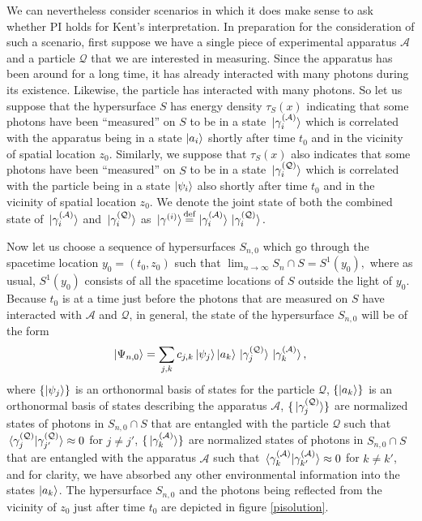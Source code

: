 We can nevertheless consider scenarios in which it does make sense to ask whether PI holds for Kent's interpretation. In preparation for the consideration of such a scenario, first suppose we have a single piece of experimental apparatus $\mathcal{A}$ and a particle $\mathcal{Q}$ that we are interested in measuring. Since the apparatus has been around for a long time, it has already interacted with many photons during its existence. Likewise, the particle has interacted with many photons. So let us suppose that the hypersurface $S$ has energy density $\tau_S(x)$ indicating that some photons have been ``measured'' on $S$ to be in a state $\ket*{\gamma_i^{(\mathcal{A})}}$ which is correlated with the apparatus being in a state $\ket{a_i}$ shortly after time $t_0$ and in the vicinity of spatial location $z_0$.  Similarly, we suppose that $\tau_S(x)$ also indicates that some photons have been ``measured'' on $S$ to be in a state $\ket*{\gamma_i^{(\mathcal{Q})}}$ which is correlated with the particle being in a state $\ket{\psi_i}$ also shortly after time $t_0$ and in the vicinity of spatial location $z_0$. We  denote the joint state of both the combined state of $\ket*{\gamma_i^{(\mathcal{A})}}$  and $\ket*{\gamma_i^{(\mathcal{Q})}}$ as
$\ket*{\gamma^{(i)}}\myeq\ket*{\gamma_i^{(\mathcal{A})}}\ket*{\gamma_i^{(\mathcal{Q})}}.$

Now let us choose a sequence of hypersurfaces $S_{n,0}$ which go through the spacetime location $y_0=(t_0, z_0)$ such that $\lim_{n\rightarrow\infty} S_n\cap S=S^1(y_0),$ where as usual,  $S^1(y_0)$ consists of all the spacetime locations of $S$ outside the light of $y_0$. Because $t_0$ is at a time just before the photons that are measured on $S$ have interacted with $\mathcal{A}$ and $\mathcal{Q}$, in general, the state of the hypersurface $S_{n,0}$ will be of the form
$$ \ket{\Psi_{n,0}}=\sum_{j,k}c_{j,k}\ket{\psi_j}\ket{a_k}\ket*{\gamma_j^{(\mathcal{Q})}}\ket*{\gamma_k^{(\mathcal{A})}},$$
where $\{\ket{\psi_j}\}$ 
is an orthonormal basis of states for the particle $\mathcal{Q}$, $\{\ket{a_k}\}$ 
is an orthonormal basis of states describing the apparatus $\mathcal{A}$, $\{\ket*{\gamma_j^{(\mathcal{Q})}}\}$ 
are normalized states of photons in $S_{n,0}\cap S$ that are entangled with the particle $\mathcal{Q}$ such that $\ip*{\gamma_j^{(\mathcal{Q})}}{\gamma_{j'}^{(\mathcal{Q})}}\approx 0$ for $j\neq j'$,   $\{\ket*{\gamma_k^{(\mathcal{A})}}\}$  are normalized states of photons in $S_{n,0}\cap S$ that are entangled with the apparatus $\mathcal{A}$ such that $\ip*{\gamma_k^{(\mathcal{A})}}{\gamma_{k'}^{(\mathcal{A})}}\approx 0$ for $k\neq k'$, and for clarity, we have absorbed any other environmental information into the states $\ket{a_k}$. The hypersurface $S_{n,0}$ and the photons being reflected from the vicinity of $z_0$ just after time $t_0$ are depicted in figure \ref{pisolution}.

